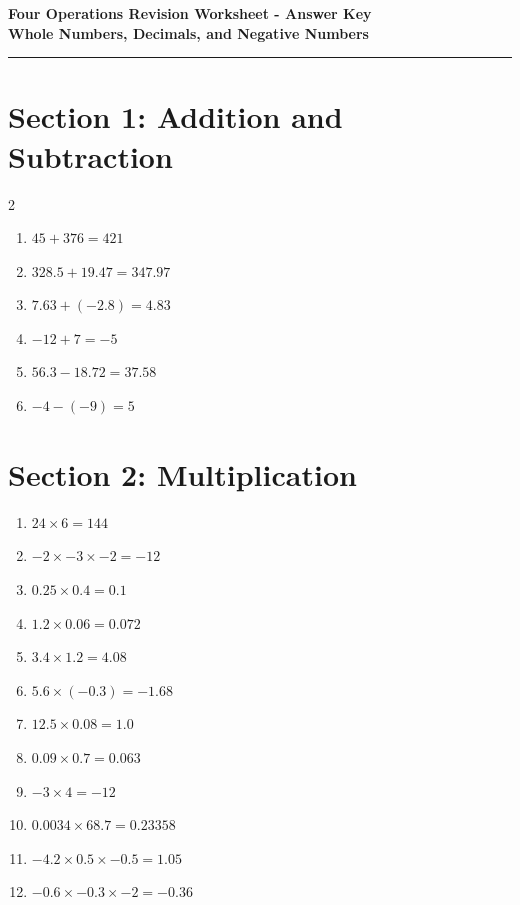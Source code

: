 \documentclass[12pt,a4paper]{article}
\begin{document}
\begin{center}
    \vspace{2em}
    {\LARGE \textbf{Four Operations Revision Worksheet - Answer Key}} \\[0.5em]
    \vspace{1em}
    \textbf{Whole Numbers, Decimals, and Negative Numbers} \\[0.5em]
    \vspace{1em}
\end{center}

\hrule
\vspace{1em}

\section*{Section 1: Addition and Subtraction}
\begin{multicols}{2}
\begin{enumerate}
    \item $45 + 376 = 421$
    \item $328.5 + 19.47 = 347.97$
    \item $7.63 + (-2.8) = 4.83$
    \item $-12 + 7 = -5$
    \item $56.3 - 18.72 = 37.58$
    \item $-4 - (-9) = 5$
\end{enumerate}
\end{multicols}

\section*{Section 2: Multiplication}
\begin{enumerate}
    \item $24 \times 6 = 144$
    \item $-2 \times -3 \times -2 = -12$
    \item $0.25 \times 0.4 = 0.1$
    \item $1.2 \times 0.06 = 0.072$
    \item $3.4 \times 1.2 = 4.08$
    \item $5.6 \times (-0.3) = -1.68$
    \item $12.5 \times 0.08 = 1.0$
    \item $0.09 \times 0.7 = 0.063$
    \item $-3 \times 4 = -12$
    \item $0.0034 \times 68.7 = 0.23358$
    \item $-4.2 \times 0.5 \times -0.5 = 1.05$
    \item $-0.6 \times -0.3 \times -2 = -0.36$
\end{enumerate}
\end{document}
